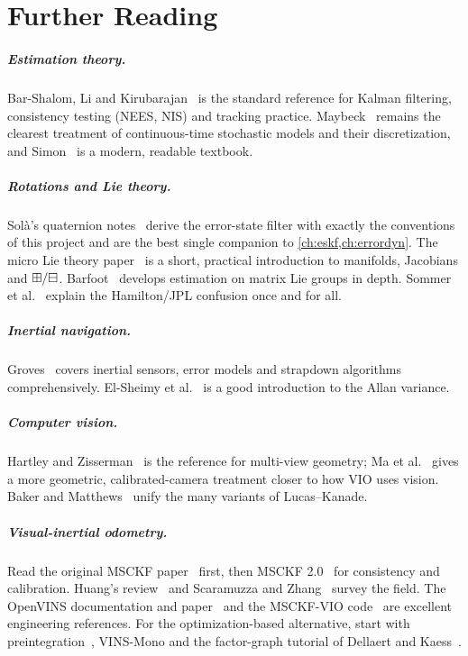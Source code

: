 \chapter*{Further Reading}

\paragraph{Estimation theory.} Bar-Shalom, Li and Kirubarajan~\cite{barshalom2001} is the standard reference for Kalman filtering,
consistency testing (NEES, NIS) and tracking practice. Maybeck~\cite{maybeck1979} remains the clearest treatment of continuous-time
stochastic models and their discretization, and Simon~\cite{simon2006} is a modern, readable textbook.

\paragraph{Rotations and Lie theory.} Solà's quaternion notes~\cite{sola2017quaternion} derive the error-state filter with exactly the
conventions of this project and are the best single companion to \cref{ch:eskf,ch:errordyn}. The micro Lie theory
paper~\cite{sola2018micro} is a short, practical introduction to manifolds, Jacobians and $\boxplus/\boxminus$. Barfoot~\cite{barfoot2017state}
develops estimation on matrix Lie groups in depth. Sommer et al.~\cite{sommer2018flipped} explain the Hamilton/JPL confusion once and for all.

\paragraph{Inertial navigation.} Groves~\cite{groves2013principles} covers inertial sensors, error models and strapdown algorithms
comprehensively. El-Sheimy et al.~\cite{elsheimy2008allan} is a good introduction to the Allan variance.

\paragraph{Computer vision.} Hartley and Zisserman~\cite{hartley2004} is the reference for multi-view geometry; Ma et
al.~\cite{ma2004invitation} gives a more geometric, calibrated-camera treatment closer to how VIO uses vision. Baker and
Matthews~\cite{baker2004lk} unify the many variants of Lucas--Kanade.

\paragraph{Visual-inertial odometry.} Read the original MSCKF paper~\cite{mourikis2007msckf} first, then MSCKF 2.0~\cite{li2013msckf2}
for consistency and calibration. Huang's review~\cite{huang2019review} and Scaramuzza and Zhang~\cite{scaramuzza2019vio} survey the
field. The OpenVINS documentation and paper~\cite{geneva2020openvins} and the MSCKF-VIO code~\cite{sun2018msckfvio} are excellent
engineering references. For the optimization-based alternative, start with preintegration~\cite{forster2017preintegration}, VINS-Mono
\cite{qin2018vins} and the factor-graph tutorial of Dellaert and Kaess~\cite{dellaert2017factor}.

